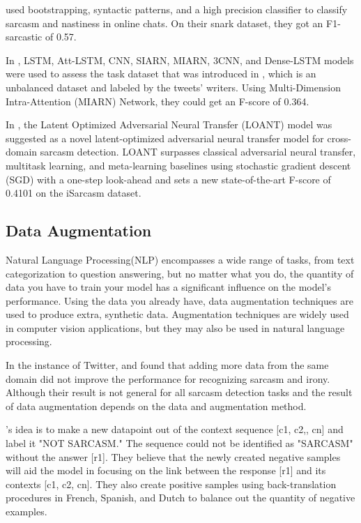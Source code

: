 \documentclass[11pt]{article}
\begin{document}
\cite{lukin2017really} used bootstrapping, syntactic patterns, and a high precision classifier to classify sarcasm and nastiness in online chats. On their snark dataset, they got an F1-sarcastic of 0.57.

In \cite{oprea2019isarcasm}, LSTM, Att-LSTM, CNN, SIARN, MIARN, 3CNN, and Dense-LSTM models were used to assess the task dataset that was introduced in \cite{oprea2019isarcasm}, which is an unbalanced dataset and labeled by the tweets' writers. Using Multi-Dimension Intra-Attention (MIARN) \cite{tay2018reasoning} Network, they could get an F-score of 0.364.

In \cite{guo2021latent}, the Latent Optimized Adversarial Neural Transfer (LOANT) model was suggested as a novel latent-optimized adversarial neural transfer model for cross-domain sarcasm detection. LOANT surpasses classical adversarial neural transfer, multitask learning, and meta-learning baselines using stochastic gradient descent (SGD) with a one-step look-ahead and sets a new state-of-the-art F-score of 0.4101 on the iSarcasm dataset.

\subsection{Data Augmentation}
Natural Language Processing(NLP) encompasses a wide range of tasks, from text categorization to question answering, but no matter what you do, the quantity of data you have to train your model has a significant influence on the model's performance. Using the data you already have, data augmentation techniques are used to produce extra, synthetic data. Augmentation techniques are widely used in computer vision applications, but they may also be used in natural language processing.

In the instance of Twitter, \cite{van2018semeval} and \cite{ilic2018deep} found that adding more data from the same domain did not improve the performance for recognizing sarcasm and irony. Although their result is not general for all sarcasm detection tasks and the result of data augmentation depends on the data and augmentation method.

\cite{lee2020augmenting}'s idea is to make a new datapoint out of the context sequence [c1, c2,, cn] and label it "NOT SARCASM." The sequence could not be identified as "SARCASM" without the answer [r1]. They believe that the newly created negative samples will aid the model in focusing on the link between the response [r1] and its contexts [c1, c2, cn]. They also create positive samples using back-translation procedures\cite{berard2019naver, zheng2019robust} in French, Spanish, and Dutch to balance out the quantity of negative examples.
\end{document}
